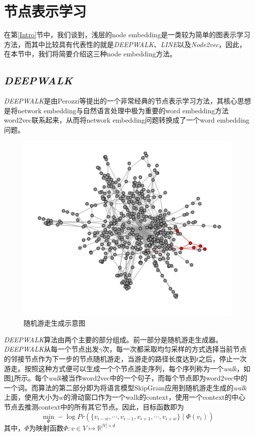 \section{节点表示学习}
在第\ref{Intro}节中，我们谈到，浅层的node embedding是一类较为简单的图表示学习方法，而其中比较具有代表性的就是\emph{DEEPWALK}、\emph{LINE}以及\emph{Node2vec}，因此，在本节中，我们将简要介绍这三种node embedding方法。

\subsection{\emph{DEEPWALK}}
\emph{DEEPWALK}是由Perozzi等\cite{perozzi2014deepwalk}提出的一个非常经典的节点表示学习方法，其核心思想是将network embedding与自然语言处理中极为重要的word embedding方法word2vec联系起来，从而将network embedding问题转换成了一个word embedding问题。

\begin{figure}[!htbp]
  \centering
  \includegraphics[scale=1]{Fig/randomwalk.pdf}
  \caption{随机游走生成示意图\cite{perozzi2014deepwalk}}
  \label{fig:randomwalk}
\end{figure}

\emph{DEEPWALK}算法由两个主要的部分组成。前一部分是随机游走生成器。\emph{DEEPWALK}从每一个节点出发$\gamma$次，每一次都采取均匀采样的方式选择当前节点的邻接节点作为下一步的节点随机游走，当游走的路径长度达到$t$之后，停止一次游走。按照这种方式便可以生成一个个节点游走序列，每个序列称为一个\emph{walk}，如图\ref{fig:randomwalk}所示。每个\emph{walk}被当作word2vec中的一个句子，而每个节点即为word2vec中的一个词。而算法的第二部分即为将语言模型SkipGram应用到随机游走生成的\emph{walk}上面，使用大小为$w$的滑动窗口作为一个walk的context，使用一个context的中心节点去推测context中的所有其它节点。因此，目标函数即为
\[\min_{\Phi}-\log{Pr}(\{v_{i-w}, \cdots, v_{i-1}, v_{i+1}, \cdots, v_{i+w}\}\mid \Phi(v_i))\]
其中，$\Phi$为映射函数$\Phi: v\in V\mapsto \mathbb{R}^{|V|\times d}$

